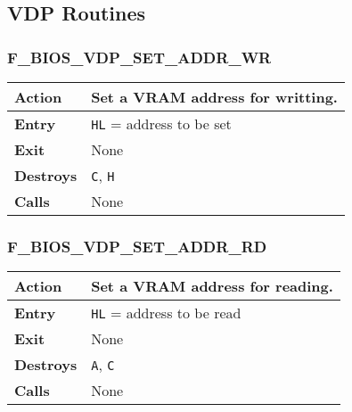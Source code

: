     \subsection{VDP Routines}

        \subsubsection{F\_BIOS\_VDP\_SET\_ADDR\_WR}
        \label{func:fbiosvdpsetaddrwr}
        \begin{tabular}{l p{9cm}}
            \hline\textbf{Action}
            & Set a \textbf{VRAM} address for writting. \\
            \hline\textbf{Entry} & \texttt{HL} = address to be set\\
            \hline\textbf{Exit} & None\\
            \hline\textbf{Destroys} & \texttt{C}, \texttt{H} \\
            \hline\textbf{Calls} & None\\
            \hline
        \end{tabular}

        \subsubsection{F\_BIOS\_VDP\_SET\_ADDR\_RD}
        \label{func:fbiosvdpsetaddrrd}
        \begin{tabular}{l p{9cm}}
            \hline\textbf{Action}
            & Set a \textbf{VRAM} address for reading. \\
            \hline\textbf{Entry} & \texttt{HL} = address to be read\\
            \hline\textbf{Exit} & None\\
            \hline\textbf{Destroys} & \texttt{A}, \texttt{C} \\
            \hline\textbf{Calls} & None\\
            \hline
        \end{tabular}

